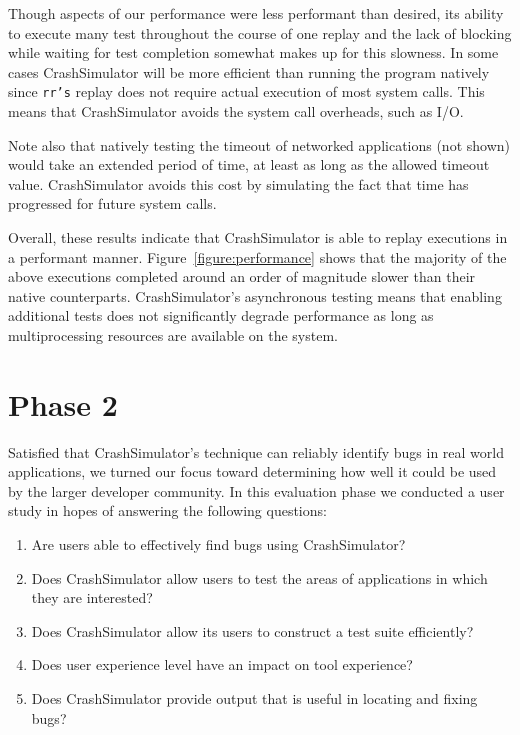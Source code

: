 Though aspects of our performance were less performant than desired, its
ability to execute many test throughout the course of one replay and the
lack of blocking while waiting for test completion somewhat makes up for
this slowness. In some cases CrashSimulator will be more efficient than
running the program natively since {\tt rr's} replay does not require
actual execution of most system calls.  This means that CrashSimulator
avoids the system call overheads, such as I/O.

Note also that natively testing the timeout of networked applications (not
shown) would take an extended period of time, at least as long as the
allowed timeout value.  CrashSimulator avoids this cost by simulating the
fact that time has progressed for future system calls.

Overall, these results indicate that CrashSimulator is able to replay
executions in a performant manner.  Figure~\ref{figure:performance} shows
that the majority of the above executions completed around an order of
magnitude slower than their native counterparts.  CrashSimulator's
asynchronous testing means that enabling additional tests does not
significantly degrade performance as long as multiprocessing resources are
available on the system.


\section{Phase 2}

Satisfied that CrashSimulator's technique can reliably identify bugs in
real world applications, we turned our focus toward determining how well it
could be used by the larger developer community.  In this evaluation phase
we conducted a user study in hopes of answering the following questions:

\begin{enumerate}

\item Are users able to effectively find bugs using CrashSimulator?

\item Does CrashSimulator allow users to test the areas of
applications in which they are interested?

\item Does CrashSimulator allow its users to construct a test suite
efficiently?

\item Does user experience level have an impact on tool experience?

\item Does CrashSimulator provide output that is useful in locating and
fixing bugs?

\end{enumerate}

